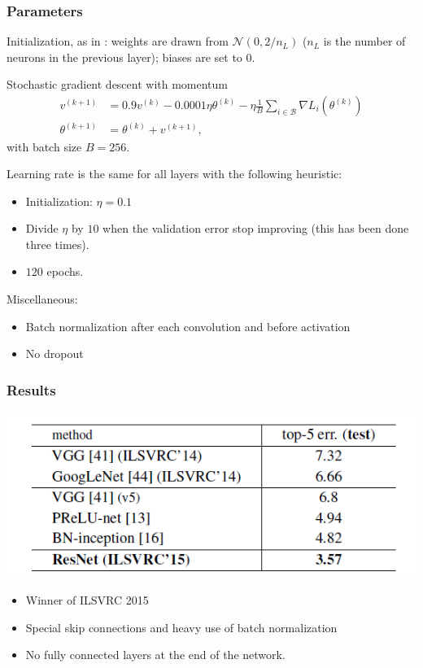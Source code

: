 \begin{frame}
	\frametitle{Parameters}
	
Initialization, as in \cite{he2015delving}: weights are drawn from $\mathcal{N}(0, 2/n_L)$ ($n_L$ is the number of neurons in the previous layer); biases are set to $0$. 

	
	\begin{block}{Stochastic gradient descent with momentum}
		\begin{align*}
			v^{(k+1)} & = 0.9 v^{(k)} - 0.0001 \eta \theta^{(k)} - \eta \frac{1}{B} \sum_{i \in \mathcal{B}} \nabla L_i (\theta^{(k)})\\
			\theta^{(k+1)} & = \theta^{(k)} + v^{(k+1)},
		\end{align*}	
		with batch size $B= 256$. 
	\end{block}
	
	
	
	Learning rate is the same for all layers with the following heuristic: 
	\begin{itemize}
		\item Initialization: $\eta = 0.1$
		\item Divide $\eta$ by $10$ when the validation error stop improving
		(this has been done three times).
		\item $120$ epochs.
	\end{itemize}
	
	Miscellaneous: 
	\begin{itemize}
		\item Batch normalization after each convolution and before activation
		\item No dropout
	\end{itemize}
\end{frame}


\begin{frame}
	\frametitle{Results}
	

	\begin{center}
		\includegraphics[scale=1]{figs/ResNet_results}
	\end{center}

	\bigskip 
	
	\begin{itemize}
		\item Winner of ILSVRC 2015
		\item Special skip connections and heavy use of batch normalization
		\item No fully connected layers at the end of the network. 
	\end{itemize}
	


\end{frame}




